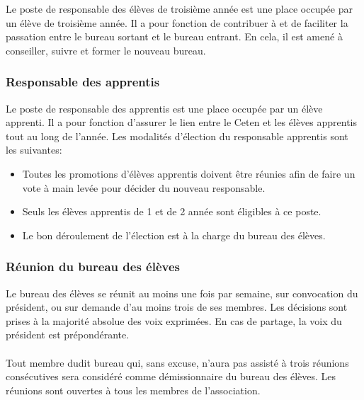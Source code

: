 \documentclass{article} %
\begin{document}
				Le poste de responsable des élèves de troisième année est une
				place occupée par un élève de troisième année. Il a pour
				fonction de contribuer à et de faciliter la passation entre le bureau sortant et le
				bureau entrant. En cela, il est amené à conseiller, suivre et
				former le nouveau bureau.

			\subsubsection{Responsable des apprentis}
\label{ssub:responsable_des_apprentis}

				Le poste de responsable des apprentis est une place occupée par
				un élève apprenti. Il a pour fonction d’assurer le lien entre le
				Ceten et les élèves apprentis tout au long de l’année. Les
				modalités d’élection du responsable apprentis sont les
				suivantes:
				\begin{itemize}
					\item Toutes les promotions d’élèves apprentis doivent être
						réunies afin de faire un vote à main levée pour décider
						du nouveau responsable.
					\item Seuls les élèves apprentis de 1 et de
						2 année sont éligibles à ce poste.
					\item Le bon déroulement de l’élection est à la charge du
						bureau des élèves.
				\end{itemize}

			\subsubsection{Réunion du bureau des élèves}
\label{ssub:reunion_du_bureau_des_eleves}

				Le bureau des élèves se réunit au moins une fois par semaine,
				sur convocation du président, ou sur demande d'au moins trois de
				ses membres. Les décisions sont prises à la majorité absolue des
				voix exprimées. En cas de partage, la voix du président est
				prépondérante. 

              \paragraph{}
				Tout membre dudit bureau qui, sans excuse, n’aura pas assisté à
				trois réunions consécutives sera considéré comme
				démissionnaire du bureau des élèves. Les réunions sont ouvertes
				à tous les membres de l’association.
\end{document}
